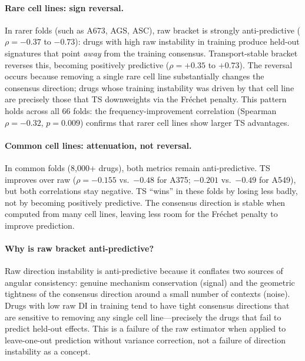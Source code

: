\documentclass[10pt]{article}
\begin{document}
\paragraph{Rare cell lines: sign reversal.}
In rarer folds (such as A673, AGS, ASC), raw bracket is strongly
anti-predictive ($\rho = -0.37$ to $-0.73$): drugs with high raw
instability in training produce held-out signatures that point
\emph{away} from the training consensus. Transport-stable bracket
reverses this, becoming positively predictive ($\rho = +0.35$ to
$+0.73$). The reversal occurs because removing a single rare cell
line substantially changes the consensus direction; drugs whose
training instability was driven by that cell line are precisely those
that TS downweights via the Fr\'{e}chet penalty. This pattern holds
across all 66 folds: the frequency-improvement correlation (Spearman
$\rho = -0.32$, $p = 0.009$) confirms that rarer cell lines show
larger TS advantages.

\paragraph{Common cell lines: attenuation, not reversal.}
In common folds (8{,}000+ drugs), both metrics remain
anti-predictive. TS improves over raw ($\rho = -0.155$ vs.\ $-0.48$ for
A375; $-0.201$ vs.\ $-0.49$ for A549), but both correlations stay
negative. TS ``wins'' in these folds by losing less badly, not by becoming
positively predictive. The consensus direction is stable when computed from
many cell lines, leaving less room for the Fr\'{e}chet penalty to
improve prediction.

\paragraph{Why is raw bracket anti-predictive?}
Raw direction instability is anti-predictive because it conflates two
sources of angular consistency: genuine mechanism conservation (signal)
and the geometric tightness of the consensus direction around a small
number of contexts (noise). Drugs with low raw DI in training tend to
have tight consensus directions that are sensitive to removing any single
cell line---precisely the drugs that fail to predict held-out effects.
This is a failure of the raw estimator when applied to leave-one-out
prediction without variance correction, not a failure of direction
instability as a concept.
\end{document}
